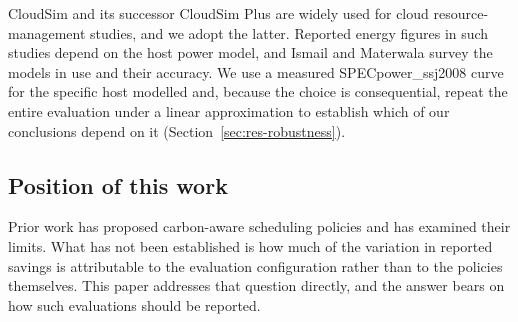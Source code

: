 CloudSim \cite{calheiros2011cloudsim} and its successor CloudSim Plus
\cite{silvafilho2017cloudsimplus} are widely used for cloud resource-management
studies, and we adopt the latter. Reported energy figures in such studies depend
on the host power model, and Ismail and Materwala \cite{ismail2020serverpower}
survey the models in use and their accuracy. We use a measured
SPECpower\_ssj2008 curve for the specific host modelled
\cite{spec2024xr8620t} and, because the choice is consequential, repeat the
entire evaluation under a linear approximation to establish which of our
conclusions depend on it (Section~\ref{sec:res-robustness}).

\subsection{Position of this work}

Prior work has proposed carbon-aware scheduling policies and has examined their
limits. What has not been established is how much of the variation in reported
savings is attributable to the evaluation configuration rather than to the
policies themselves. This paper addresses that question directly, and the answer
bears on how such evaluations should be reported.
